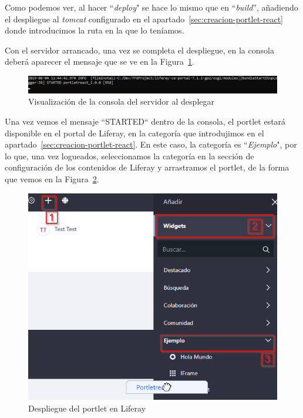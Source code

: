 \documentclass[a4paper, 12pt]{book}
\begin{document}
Como podemos ver, al hacer ``\textit{deploy}" se hace lo mismo que en ``\textit{build}'', añadiendo el despliegue al \textit{tomcat} configurado en el apartado~\ref{sec:creacion-portlet-react} donde introducimos la ruta en la que lo teníamos.

\vspace{5mm}
Con el servidor arrancado, una vez se completa el despliegue, en la consola deberá aparecer el mensaje que se ve en la Figura~\ref{fig:started}.
\begin{figure}[h]
  \centering
  \includegraphics[width=15cm]{img_usadas/started.png}
  \caption{Visualización de la consola del servidor al desplegar}
  \label{fig:started}
\end{figure}

\vspace{5mm}
Una vez vemos el mensaje ``STARTED`` dentro de la consola, el portlet estará disponible en el portal de Liferay, en la categoría que introdujimos en el apartado~\ref{sec:creacion-portlet-react}. En este caso, la categoría es ``\textit{Ejemplo}", por lo que, una vez logueados, seleccionamos la categoría en la sección de configuración de los contenidos de Liferay y arrastramos el portlet, de la forma que vemos en la Figura~\ref{fig:liferay_ex}.
\begin{figure}[h]
  \centering
  \includegraphics{img_usadas/liferay_ex.png}
  \caption{Despliegue del portlet en Liferay}
  \label{fig:liferay_ex}
\end{figure}
\end{document}
